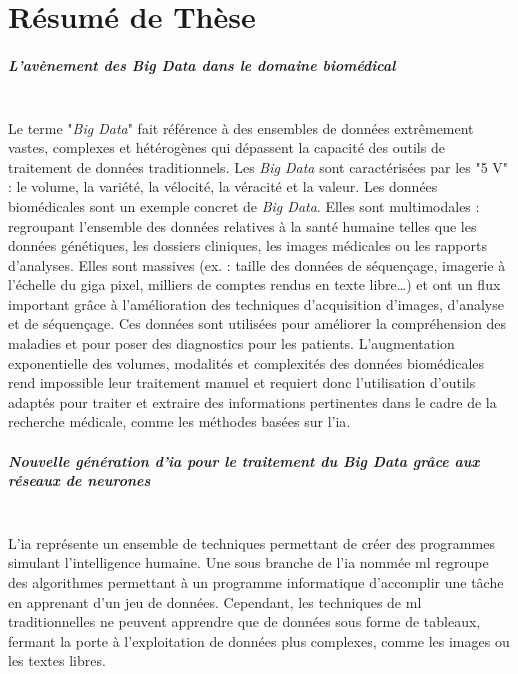 \chapter{Résumé de Thèse}
\paragraph{\textbf{L’avènement des \textit{Big Data} dans le domaine biomédical}}\mbox{}\\

Le terme "\textit{Big Data}" fait référence à des ensembles de données extrêmement vastes, complexes et hétérogènes qui dépassent la capacité des outils de traitement de données traditionnels. Les \textit{Big Data} sont caractérisées par les "5 V" : le volume, la variété, la vélocité, la véracité et la valeur. Les données biomédicales sont un exemple concret de \textit{Big Data}. Elles sont multimodales : regroupant l’ensemble des données relatives à la santé humaine telles que les données génétiques, les dossiers cliniques, les images médicales ou les rapports d’analyses. Elles sont massives (ex. : taille des données de séquençage, imagerie à l’échelle du giga pixel, milliers de comptes rendus en texte libre…) et ont un flux important grâce à l’amélioration des techniques d’acquisition d’images, d’analyse et de séquençage. Ces données sont utilisées pour améliorer la compréhension des maladies et pour poser des diagnostics pour les patients. L’augmentation exponentielle des volumes, modalités et complexités des données biomédicales rend impossible leur traitement manuel et requiert donc l’utilisation d’outils adaptés pour traiter et extraire des informations pertinentes dans le cadre de la recherche médicale, comme les méthodes basées sur l’\gls{ia}.

\paragraph{\textbf{Nouvelle génération d’\gls{ia} pour le traitement du \textit{Big Data} grâce aux réseaux de neurones}}\mbox{}\\

L’\gls{ia} représente un ensemble de techniques permettant de créer des programmes simulant l’intelligence humaine. Une sous branche de l’\gls{ia} nommée \gls{ml} regroupe des algorithmes permettant à un programme informatique d’accomplir une tâche en apprenant d’un jeu de données. Cependant, les techniques de \gls{ml} traditionnelles ne peuvent apprendre que de données sous forme de tableaux, fermant la porte à l’exploitation de données plus complexes, comme les images ou les textes libres.

